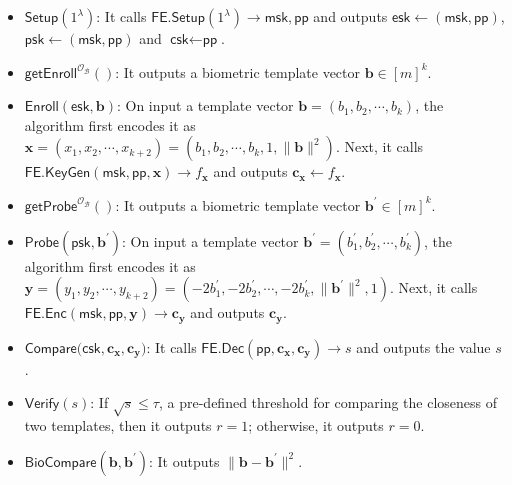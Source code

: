 \begin{itemize}

	\item $\textsf{Setup}(1^\lambda)$: It calls $\textsf{FE.Setup}(1^\lambda) \to \textsf{msk}, \textsf{pp}$ and outputs $\textsf{esk} \gets (\textsf{msk}, \textsf{pp})$, $\textsf{psk} \gets (\textsf{msk}, \textsf{pp})$ and $\textsf{csk} \gets \textsf{pp}$.

	\item $\textsf{getEnroll}^{\mathcal{O}_{\mathcal{B}}}()$: It outputs a biometric template vector $\mathbf{b} \in [m]^k$. 

	\item $\textsf{Enroll}(\textsf{esk}, \mathbf{b})$: On input a template vector $\mathbf{b} = (b_1, b_2, \cdots, b_k)$, the algorithm first encodes it as $\mathbf{x} = (x_1, x_2, \cdots, x_{k+2}) = (b_1, b_2, \cdots, b_k, 1, \|\mathbf{b}\|^2)$. Next, it calls $\textsf{FE.KeyGen}(\textsf{msk}, \textsf{pp}, \mathbf{x}) \to f_\mathbf{x}$ and outputs $\mathbf{c_x} \gets f_\mathbf{x}$.

	\item $\textsf{getProbe}^{\mathcal{O}_{\mathcal{B}}}()$: It outputs a biometric template vector $\mathbf{b}^\prime \in [m]^k$.

	\item $\textsf{Probe}(\textsf{psk}, \mathbf{b}^\prime)$: On input a template vector $\mathbf{b}^\prime = (b_1^\prime, b_2^\prime, \cdots, b_k^\prime)$, the algorithm first encodes it as $\mathbf{y} = (y_1, y_2, \cdots, y_{k+2}) = (-2b_1^\prime, -2b_2^\prime, \cdots, -2b_k^\prime, \|\mathbf{b}^\prime\|^2, 1)$. Next, it calls $\textsf{FE.Enc}(\textsf{msk}, \textsf{pp}, \mathbf{y}) \to \mathbf{c_y}$ and outputs $\mathbf{c_y}$.

	\item $\textsf{Compare}(\textsf{csk}, \mathbf{c_x}, \mathbf{c_y)}$: It calls $\textsf{FE.Dec}(\textsf{pp}, \mathbf{c_x}, \mathbf{c_y}) \to s$ and outputs the value $s$.

	\item $\textsf{Verify}(s)$: If $\sqrt{s} \leq \tau$, a pre-defined threshold for comparing the closeness of two templates, then it outputs $r = 1$; otherwise, it outputs $r = 0$.

	\item $\textsf{BioCompare}(\mathbf{b}, \mathbf{b}^\prime)$: It outputs $\| \mathbf{b} - \mathbf{b}^\prime\|^2$.

\end{itemize}

